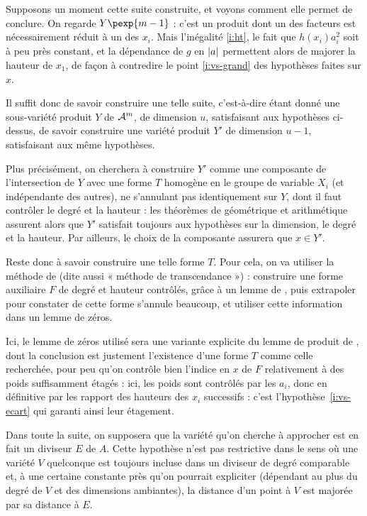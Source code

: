Supposons un moment cette suite construite, et voyons comment elle permet de
conclure. On regarde $Y\pexp{m-1}$ : c'est un produit dont un des facteurs est
nécessairement réduit à un des $x_i$. Mais l'inégalité \ref{i:ht}, le fait que
$h(x_i)a_i^2$ soit à peu près constant, et la dépendance de $g$ en $\lvert a\rvert$
permettent alors de majorer la hauteur de $x_1$, de façon à contredire le
point \ref{i:vs-grand} des hypothèses faites sur $x$.

Il suffit donc de savoir construire une telle suite, c'est-à-dire étant donné
une sous-variété produit $Y$ de $\mathcal A^m$, de dimension $u$, satisfaisant aux
hypothèses ci-dessus, de savoir construire une variété produit $Y'$ de
dimension $u-1$, satisfaisant aux même hypothèses.

Plus précisément, on cherchera à construire $Y'$ comme une composante de
l'intersection de $Y$ avec une forme $T$ homogène en le groupe de variable
$X_i$ (et indépendante des autres), ne s'annulant pas identiquement sur $Y$,
dont il faut contrôler le degré et la hauteur : les théorèmes de 
géométrique et arithmétique assurent alors que $Y'$ satisfait toujours aux
hypothèses sur la dimension, le degré et la hauteur. Par ailleurs, le choix de
la composante assurera que $x \in Y'$.

Reste donc à savoir construire une telle forme $T$. Pour cela, on va utiliser
la méthode de  (dite aussi « méthode de transcendance ») :
construire une forme auxiliaire $F$ de degré et hauteur contrôlés, grâce à un
lemme de , puis extrapoler pour constater de cette forme s'annule
beaucoup, et utiliser cette information dans un lemme de zéros.

Ici, le lemme de zéros utilisé sera une variante explicite du lemme de produit
de , dont la conclusion est justement l'existence d'une forme
$T$ comme celle recherchée, pour peu qu'on contrôle bien l'indice en $x$ de
$F$ relativement à des poids suffisamment étagés : ici, les poids sont
contrôlés par les $a_i$, donc en définitive par les rapport des hauteurs des
$x_i$ successifs : c'est l'hypothèse~\ref{i:vs-ecart} qui garanti ainsi leur
étagement.

Dans toute la suite, on supposera que la variété qu'on cherche à approcher est
en fait un diviseur $E$ de $A$. Cette hypothèse n'est pas restrictive dans le
sens où une variété $V$ quelconque est toujours incluse dans un diviseur de
degré comparable et, à une certaine constante près qu'on pourrait expliciter
(dépendant au plus du degré de $V$ et des dimensions ambiantes), la distance
d'un point à $V$ est majorée par sa distance à $E$.

